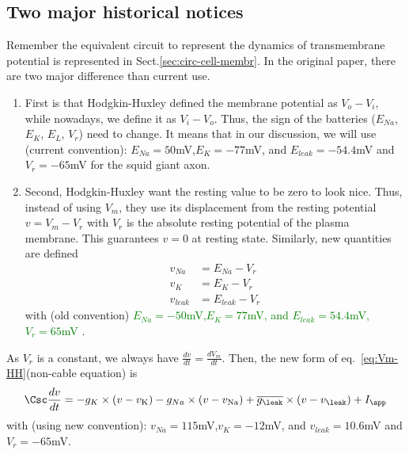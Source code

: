 \subsection{Two major historical notices}
\label{sec:historical-notice}

Remember the equivalent circuit to represent the dynamics of transmembrane
potential is represented in Sect.\ref{sec:circ-cell-membr}.
In the original paper, there are two major difference than current use.

\begin{enumerate}

  \item  First is that Hodgkin-Huxley defined the membrane potential as
  $V_o-V_i$, while nowadays, we define it as $V_i-V_o$. Thus, the sign of the
  batteries ($E_{Na}$, $E_{K}$, $E_L$, $V_r$) need to change. It means that in
  our discussion, we will use (current convention): $E_{Na} = 50$mV,$E_{K} =
  -77$mV, and $E_{leak} = -54.4$mV and $V_r=-65$mV for the squid giant axon.

  \item Second, Hodgkin-Huxley want the resting value to be zero to look nice.
  Thus, instead of using $V_m$, they use its displacement from the resting
  potential $v=V_m-V_r$ with $V_r$ is the absolute resting potential of the
  plasma membrane. This guarantees $v=0$ at resting state. Similarly, new
  quantities are defined
\begin{equation}
  \label{eq:156}
  \begin{split}
    v_{Na} &= E_{Na} - V_r\\
    v_{K} &= E_{K} - V_r \\
    v_{leak} &= E_{leak} - V_r
  \end{split}
\end{equation}
with (old convention)
\textcolor{green}{$E_{Na} = -50$mV,$E_{K} = 77$mV, and $E_{leak} =
  54.4$mV, $V_r=65$mV} .

\end{enumerate}

As $V_{r}$ is a constant, we always have $\frac{dv}{dt} = \frac{dV_m}{dt}$.
Then, the new form of eq.~\eqref{eq:Vm-HH}(non-cable equation) is
\begin{equation}
  \label{eq:348}
  \Csc \frac{dv}{dt} =  -g_K \times (v-v_{\ce{K}})
  -g_{Na} \times (v-v_{\ce{Na}})+ \overline{g_{\leak}} \times (v-v_{\leak}) + I_\app
\end{equation}
with (using new convention): $v_{Na} = 115$mV,$v_{K} = -12$mV, and $v_{leak} =
10.6$mV and $V_r=-65$mV.



